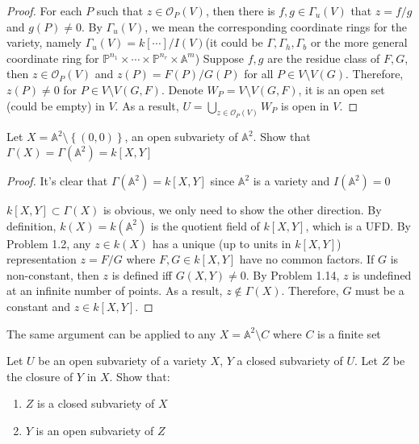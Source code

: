 \documentclass{solution}
\begin{document}
\begin{proof}
    For each $P$ such that $z \in \mathcal{O}_{P}(V)$, then there is $f, g \in \Gamma_u(V)$ that $z = f / g$ and $g(P) \ne 0$. By $\Gamma_u(V)$, we mean the corresponding coordinate rings for the variety, namely $\Gamma_u(V) = k[\cdots] / I(V)$(it could be $\Gamma, \Gamma_h, \Gamma_b$ or the more general coordinate ring for $\mathbb{P}^{n_1} \times \cdots \times \mathbb{P}^{n_r} \times \mathbb{A}^m$) Suppose $f, g$ are the residue class of $F, G$, then $z \in \mathcal{O}_{P}(V)$ and $z(P) = F(P) / G(P)$ for all $P \in V \setminus V(G)$. Therefore, $z(P) \ne 0$ for $P \in V \setminus V(G, F)$. Denote $W_P = V \setminus V(G, F)$, it is an open set (could be empty) in $V$. As a result, $U = \bigcup\limits_{z \in \mathcal{O}_{P}(V)} W_P$ is open in $V$.
\end{proof}

\begin{problem}{6.9}
    Let $X = \mathbb{A}^2 \setminus \left\lbrace (0, 0) \right\rbrace$, an open subvariety of $\mathbb{A}^2$. Show that $\Gamma(X) = \Gamma(\mathbb{A}^2) = k[X, Y]$
\end{problem}

\begin{proof}
    It's clear that $\Gamma(\mathbb{A}^2) = k[X, Y]$ since $\mathbb{A}^2$ is a variety and $I(\mathbb{A}^2) = 0$

    $k[X, Y] \subset \Gamma(X)$ is obvious, we only need to show the other direction. By definition, $k(X) = k(\mathbb{A}^2)$ is the quotient field of $k[X, Y]$, which is a UFD. By Problem 1.2, any $z \in k(X)$ has a unique (up to units in $k[X, Y]$) representation $z = F / G$ where $F, G \in k[X, Y]$ have no common factors. If $G$ is non-constant, then $z$ is defined iff $G(X, Y) \ne 0$. By Problem 1.14, $z$ is undefined at an infinite number of points. As a result, $z \notin \Gamma(X)$. Therefore, $G$ must be a constant and $z \in k[X, Y]$.
\end{proof}

\begin{remark}
    The same argument can be applied to any $X = \mathbb{A}^2 \setminus C$ where $C$ is a finite set
\end{remark}

\begin{problem}{6.10}
    Let $U$ be an open subvariety of a variety $X$, $Y$ a closed subvariety of $U$. Let $Z$ be the closure of $Y$ in $X$. Show that:
    \begin{enumerate}
        \item $Z$ is a closed subvariety of $X$
        \item $Y$ is an open subvariety of $Z$
    \end{enumerate}
\end{problem}
\end{document}
